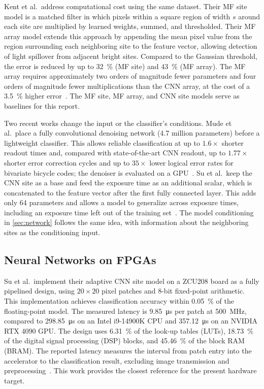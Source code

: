 Kent et al.\ address computational cost using the same dataset. Their MF site model is a matched filter in which pixels within a square region of width $s$ around each site are multiplied by learned weights, summed, and thresholded. Their MF array model extends this approach by appending the mean pixel value from the region surrounding each neighboring site to the feature vector, allowing detection of light spillover from adjacent bright sites. Compared to the Gaussian threshold, the error is reduced by up to \SI{32}{\percent} (MF site) and \SI{43}{\percent} (MF array). The MF array requires approximately two orders of magnitude fewer parameters and four orders of magnitude fewer multiplications than the CNN array, at the cost of a \SI{3.5}{\percent} higher error~\cite{kent2025}. The MF site, MF array, and CNN site models serve as baselines for this report.


Two recent works change the input or the classifier's conditions. Mude et al.\ place a fully convolutional denoising network (4.7 million parameters) before a lightweight classifier. This allows reliable classification at up to $1.6\times$ shorter readout times and, compared with state-of-the-art CNN readout, up to $1.77\times$ shorter error correction cycles and up to $35\times$ lower logical error rates for bivariate bicycle codes; the denoiser is evaluated on a GPU~\cite{mude2025}. Su et al.\ keep the CNN site as a base and feed the exposure time as an additional scalar, which is concatenated to the feature vector after the first fully connected layer. This adds only 64 parameters and allows a model to generalize across exposure times, including an exposure time left out of the training set~\cite{su2026}. The model conditioning in \cref{sec:network} follows the same idea, with information about the neighboring sites as the conditioning input.


\subsection{Neural Networks on FPGAs}


Su et al.\ implement their adaptive CNN site model on a ZCU208 board as a fully pipelined design, using $20\times20$ pixel patches and 8-bit fixed-point arithmetic. This implementation achieves classification accuracy within \SI{0.05}{\percent} of the floating-point model. The measured latency is \SI{9.85}{\micro\second} per patch at \SI{500}{\mega\hertz}, compared to \SI{298.85}{\micro\second} on an Intel i9-14900K CPU and \SI{357.12}{\micro\second} on an NVIDIA RTX 4090 GPU. The design uses \SI{6.31}{\percent} of the look-up tables (LUTs), \SI{18.73}{\percent} of the digital signal processing (DSP) blocks, and \SI{45.46}{\percent} of the block RAM (BRAM). The reported latency measures the interval from patch entry into the accelerator to the classification result, excluding image transmission and preprocessing~\cite{su2026}. This work provides the closest reference for the present hardware target.


